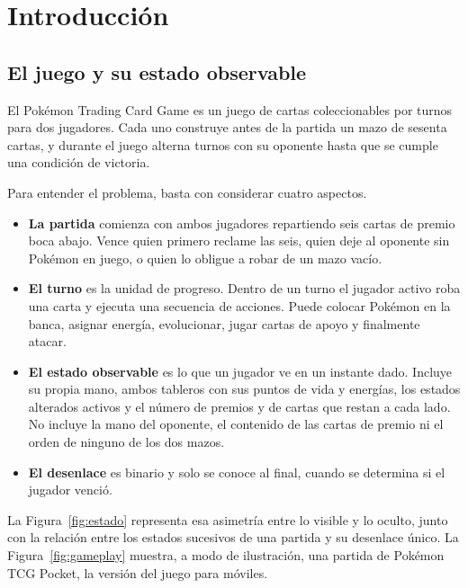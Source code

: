 %
\section{Introducción}
\label{sec:introduccion}

\subsection{El juego y su estado observable}
\label{subsec:juego}

El Pok\'emon Trading Card Game es un juego de cartas coleccionables por
turnos para dos jugadores. Cada uno construye antes de la partida un mazo de
sesenta cartas, y durante el juego alterna turnos con su oponente hasta que
se cumple una condición de victoria.

Para entender el problema, basta con considerar cuatro aspectos.

\begin{itemize}
  \item \textbf{La partida} comienza con ambos jugadores repartiendo seis
        cartas de premio boca abajo. Vence quien primero reclame las seis,
        quien deje al oponente sin Pok\'emon en juego, o quien lo obligue a
        robar de un mazo vacío.
  \item \textbf{El turno} es la unidad de progreso. Dentro de un turno el
        jugador activo roba una carta y ejecuta una secuencia de acciones. Puede colocar Pok\'emon en la banca, asignar energía, evolucionar, jugar
        cartas de apoyo y finalmente atacar.
  \item \textbf{El estado observable} es lo que un jugador ve en un instante
        dado. Incluye su propia mano, ambos tableros con sus puntos de vida
        y energías, los estados alterados activos y el número de premios y
        de cartas que restan a cada lado. No incluye la mano del oponente,
        el contenido de las cartas de premio ni el orden de ninguno de los
        dos mazos.
  \item \textbf{El desenlace} es binario y solo se conoce al final, cuando se determina si el jugador venció.
\end{itemize}

La Figura~\ref{fig:estado} representa esa asimetría entre lo visible y lo
oculto, junto con la relación entre los estados sucesivos de una partida y
su desenlace único. La Figura~\ref{fig:gameplay} muestra, a modo de
ilustración, una partida de Pokémon TCG Pocket, la versión del juego para
móviles.

